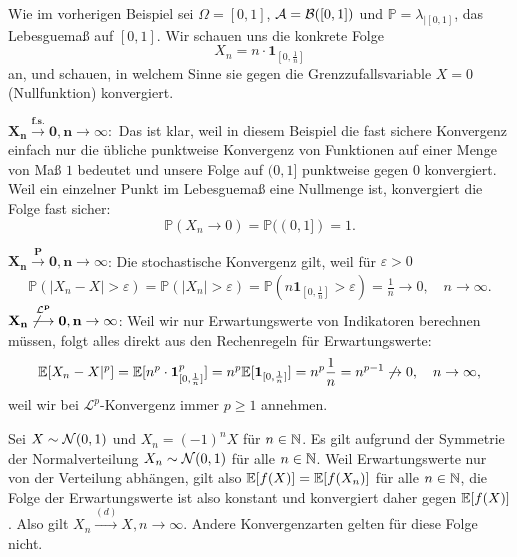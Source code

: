 \begin{beispiel}
Wie im vorherigen Beispiel sei $\Omega = [0,1]$, $\mathcal{A} = \mathcal{B}([0,1])$ und $\mathbb{P} = \lambda_{|[0,1]}$, das Lebesguema\ss{} auf $[0,1]$. Wir schauen uns die konkrete Folge $$X_n = n \cdot \mathbf{1}_{[0,\frac{1}{n}]}$$ an, und schauen, in welchem Sinne sie gegen die Grenzzufallsvariable $X=0$ (Nullfunktion) konvergiert. \smallskip
			
	$\mathbf{X_n \overset{\text{f.s.}}{\longrightarrow} 0, n \to \infty:}$ Das ist klar, weil in diesem Beispiel die fast sichere Konvergenz einfach nur die \"ubliche punktweise Konvergenz von Funktionen auf einer Menge von Ma\ss{} $1$ bedeutet und unsere Folge auf $(0,1]$ punktweise gegen $0$ konvergiert. Weil ein einzelner Punkt im Lebesguema\ss{} eine Nullmenge ist, konvergiert die Folge fast sicher:	
	$$\mathbb{P}(X_n \to 0) = \mathbb{P}((0,1]) = 1.$$
	
	$\mathbf{X_n \overset{P}{\longrightarrow} 0, n \to \infty}$:	Die stochastische Konvergenz gilt, weil f\"ur $\varepsilon > 0$
	\begin{align*}
		\mathbb{P}(|X_n-X| > \varepsilon) = \mathbb{P}(|X_n| > \varepsilon) 
		= \mathbb{P}(n\mathbf{1}_{[0,\frac{1}{n}]} > \varepsilon)
		=\frac{1}{n} \to 0, \quad n\to\infty.
	\end{align*}	
	$\mathbf{X_n \overset{\mathcal{L}^p}{\not\longrightarrow} 0, n \to \infty}$: Weil wir nur Erwartungswerte von Indikatoren berechnen m\"ussen, folgt alles direkt aus den Rechenregeln f\"ur Erwartungswerte:
	\begin{align*}
		\mathbb{E}[X_n-X|^p] = \mathbb{E}[n^p \cdot \mathbf{1}_{[0,\frac{1}{n}]}^p]
		 = n^p \mathbb{E}[ \mathbf{1}_{[0,\frac{1}{n}]}] 
		= n^p  \frac{1}{n} = n^{p-1} \not\to 0,\quad  n \to \infty,
	\end{align*}
	weil wir bei $\mathcal L^p$-Konvergenz immer $p\geq 1$ annehmen.
\end{beispiel}
\begin{beispiel}
	Sei $X \sim \mathcal{N}(0,1)$ und $X_n = (-1)^n X$ f\"ur $n\in \mathbb{N}$. Es gilt aufgrund der Symmetrie der Normalverteilung $X_n \sim \mathcal{N}(0,1)$ f\"ur alle $n\in\mathbb{N}$. Weil Erwartungswerte nur von der Verteilung abh\"angen, gilt also $\mathbb{E}[f(X)]=\mathbb{E}[f(X_n)]$ f\"ur alle $n\in\mathbb{N}$, die Folge der Erwartungswerte ist also konstant und konvergiert daher gegen $\mathbb{E}[f(X)]$. Also gilt $X_n \overset{(d)}{\longrightarrow} X, n\to\infty$. Andere Konvergenzarten gelten f\"ur diese Folge nicht.
\end{beispiel}

